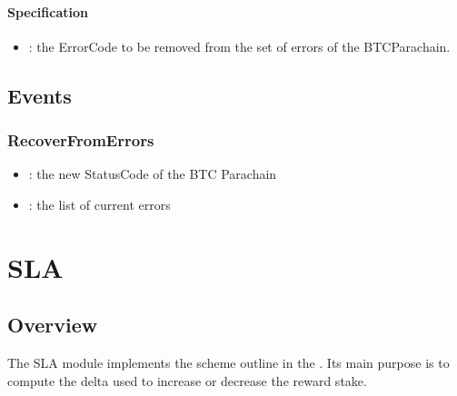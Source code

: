 \documentclass[a4paper,10pt,english]{sphinxmanual}
\begin{document}
\subsubsection{Specification}
\label{\detokenize{spec/security:id12}}


\begin{itemize}
\item {} 
: the ErrorCode to be removed from the set of errors of the BTC\sphinxhyphen{}Parachain.

\end{itemize}


\section{Events}
\label{\detokenize{spec/security:events}}

\subsection{RecoverFromErrors}
\label{\detokenize{spec/security:recoverfromerrors}}


\begin{itemize}
\item {} 
: the new StatusCode of the BTC Parachain

\item {} 
: the list of current errors

\end{itemize}


\chapter{SLA}
\label{\detokenize{spec/sla:sla}}\label{\detokenize{spec/sla:id1}}\label{\detokenize{spec/sla::doc}}

\section{Overview}
\label{\detokenize{spec/sla:overview}}
The SLA module implements the scheme outline in the {\hyperref[\detokenize{economics/SLA:service-level-agreements}]{}}. Its main purpose is to compute the delta used to increase or decrease the reward stake.
\end{document}
